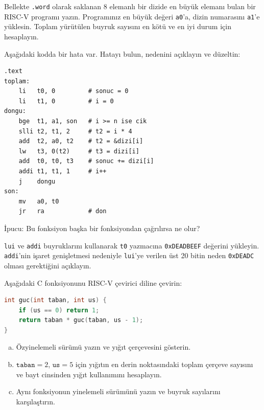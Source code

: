 \begin{alistirma}[\orta]
Bellekte \texttt{.word} olarak saklanan 8 elemanlı bir dizide en büyük elemanı bulan bir RISC-V programı yazın. Programınız en büyük değeri \texttt{a0}'a, dizin numarasını \texttt{a1}'e yüklesin. Toplam yürütülen buyruk sayısını en kötü ve en iyi durum için hesaplayın.
\end{alistirma}

\begin{alistirma}[\orta]
Aşağıdaki kodda bir hata var. Hatayı bulun, nedenini açıklayın ve düzeltin:
\begin{lstlisting}[style=riscv]
    .text
toplam:
    li   t0, 0         # sonuc = 0
    li   t1, 0         # i = 0
dongu:
    bge  t1, a1, son   # i >= n ise cik
    slli t2, t1, 2     # t2 = i * 4
    add  t2, a0, t2    # t2 = &dizi[i]
    lw   t3, 0(t2)     # t3 = dizi[i]
    add  t0, t0, t3    # sonuc += dizi[i]
    addi t1, t1, 1     # i++
    j    dongu
son:
    mv   a0, t0
    jr   ra            # don
\end{lstlisting}
İpucu: Bu fonksiyon başka bir fonksiyondan çağrılırsa ne olur?
\end{alistirma}

\begin{alistirma}[\orta]
\texttt{lui} ve \texttt{addi} buyruklarını kullanarak \texttt{t0} yazmacına \texttt{0xDEADBEEF} değerini yükleyin. \texttt{addi}'nin işaret genişletmesi nedeniyle \texttt{lui}'ye verilen üst 20 bitin neden \texttt{0xDEADC} olması gerektiğini açıklayın.
\end{alistirma}

\begin{alistirma}[\zor]
Aşağıdaki C fonksiyonunu RISC-V çevirici diline çevirin:
\begin{lstlisting}[language=C, style=alistirma-kod]
int guc(int taban, int us) {
    if (us == 0) return 1;
    return taban * guc(taban, us - 1);
}
\end{lstlisting}
\begin{enumerate}[(a)]
\item Özyinelemeli sürümü yazın ve yığıt çerçevesini gösterin.
\item $\texttt{taban} = 2$, $\texttt{us} = 5$ için yığıtın en derin noktasındaki toplam çerçeve sayısını ve bayt cinsinden yığıt kullanımını hesaplayın.
\item Aynı fonksiyonun yinelemeli sürümünü yazın ve buyruk sayılarını karşılaştırın.
\end{enumerate}
\end{alistirma}


